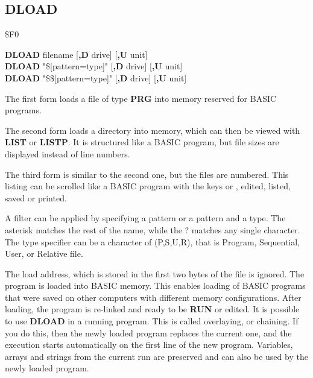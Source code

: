 
\newpage
\subsection{DLOAD}
\begin{description}[leftmargin=2cm,style=nextline]
\item [Token:] \$F0
\item [Format:] {\bf DLOAD} filename [{\bf,D} drive] [{\bf,U} unit] \\
                {\bf DLOAD} "\$[pattern=type]" [{\bf,D} drive] [{\bf,U} unit] \\
                {\bf DLOAD} "\$\$[pattern=type]" [{\bf,D} drive] [{\bf,U} unit]

\item [Usage:] The first form loads a file of type
   {\bf PRG} into memory reserved for BASIC programs.

The second form loads a directory into memory, which can then be viewed
with {\bf LIST} or {\bf LISTP}. It is structured like a BASIC program,
but file sizes are displayed instead of line numbers.

The third form is similar to the second one, but the files are numbered.
This listing can be scrolled like a BASIC program with the keys 
or , edited, listed, saved or printed.

A filter can be applied by specifying a pattern or a pattern and a type.
The asterisk \* matches the rest of the name, while the ? matches any single character.
The type specifier can be a character of (P,S,U,R), that is Program, Sequential, User,
or Relative file.

   \filenamedefinition

   \drivedefinition

   \unitdefinition

\item [Remarks:]
   The load address, which is stored in the first two bytes
   of the file is ignored. The program is loaded into
   BASIC memory. This enables loading of BASIC programs
   that were saved on other computers with different memory
   configurations. After loading, the program is re-linked
   and ready to be {\bf RUN} or edited.
   It is possible to use {\bf DLOAD} in a running program. This is
   called overlaying, or chaining.
   If you do this, then the newly loaded program replaces the current one,
   and the execution starts automatically on the first line of the
   new program. Variables, arrays and strings from the current
   run are preserved and can also be used by the newly loaded program.


\end{description}
